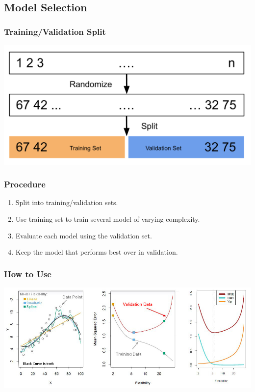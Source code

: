 \documentclass{beamer}
\begin{document}
\subsection{Model Selection}
\begin{frame}
  \frametitle{Training/Validation Split}
  \includegraphics[width=\textwidth]{images/train_validation_split.png}
\end{frame}

\begin{frame}
  \frametitle{Procedure}
  \begin{enumerate}
    \item Split into training/validation sets.
    \item Use training set to train several model of varying complexity.
    \item Evaluate each model using the validation set.
    \item Keep the model that performs best over in validation.
  \end{enumerate}
\end{frame}

\begin{frame}
  \frametitle{How to Use}
  \includegraphics[width=\textwidth]{images/bias_variance_tradeoff.jpg}
\end{frame}
\end{document}
